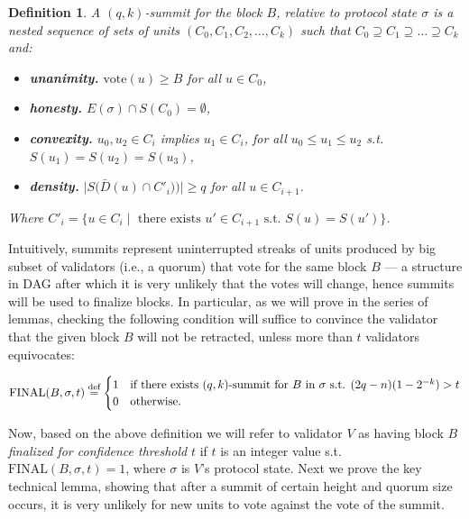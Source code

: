 \documentclass[12pt, fleqn]{article}
\newtheorem{definition}{Definition}
\newcommand{\vote}{\mathrm{vote}}
\newcommand{\final}{\mathrm{FINAL}}
\newcommand{\defeq}{\stackrel{\textup{def}}{=}}
\begin{document}
\begin{definition}
A $(q,k)$-summit for the block $B$, relative to protocol state $\sigma$ is a nested sequence of sets of units $(C_0, C_1, C_2, \dots, C_k)$ such that $C_0\supseteq C_1 \supseteq \ldots \supseteq C_k$ and:
\begin{itemize}
  \item {\bf unanimity.} $\vote(u) \geq B$ for all $u\in C_0$,
  \item {\bf honesty.} $E(\sigma) \cap S(C_0) = \emptyset$,
  \item {\bf convexity.} $u_0, u_2 \in C_i$ implies $u_1 \in C_i$, for all $u_0  \leq u_1 \leq u_2$ s.t. $S(u_1) = S(u_2) = S(u_3)$,
  \item {\bf density.} $\big|S\big(\bar{D}(u) \cap C'_i)\big)\big| \geq q$ for all $u \in C_{i + 1}$.
\end{itemize}
Where $C'_i = \big\{u\in C_i \mid \text{ there exists } u'\in C_{i+1} \text{ s.t. } S(u) = S(u') \big\}$.
\end{definition}

Intuitively, summits represent uninterrupted streaks of units produced by big subset of validators (i.e., a quorum) that vote for the same block $B$ --- a structure in DAG after which it is very unlikely that the votes will change, hence summits will be used to finalize blocks.
In particular, as we will prove in the series of lemmas, checking the following condition will suffice to convince the validator that the given block $B$ will not be retracted, unless more than $t$ validators equivocates:

$$
   \final(B, \sigma, t) \defeq \begin{cases}
    1 &\mbox{if } \text{there exists $(q,k)$-summit for $B$ in $\sigma$ s.t. }(2q-n)(1-2^{-k})>t\\
    0 &\mbox{otherwise}.
    \end{cases}
$$

Now, based on the above definition we will refer to validator $V$ as having block $B$ \emph{finalized for confidence threshold} $t$ if $t$ is an integer value s.t. $\final(B,\sigma,t) = 1$, where $\sigma$ is $V$'s protocol state.
Next we prove the key technical lemma, showing that after a summit of certain height and quorum size occurs, it is very unlikely for new units to vote against the vote of the summit. 
\end{document}
